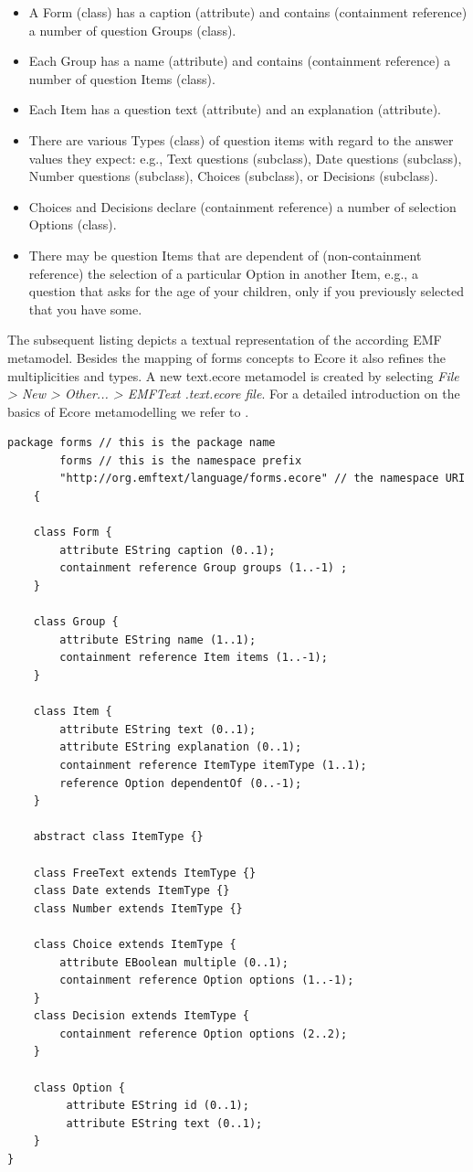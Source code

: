 		\begin{itemize} 
		  \item A Form (class) has a caption (attribute) and contains (containment
		  reference) a number of question Groups (class).
		  \item Each Group has a name (attribute) and contains (containment reference)
		  a number of question Items (class).
		  \item Each Item has a question text (attribute) and an explanation
		  (attribute).
		  \item There are various Types (class) of question items  with
		  regard to the answer values they expect: e.g., Text questions
		  (subclass), Date questions  (subclass), Number questions  (subclass),
		  Choices (subclass), or Decisions (subclass).
		  \item Choices and Decisions declare (containment reference) a number of
		  selection Options (class).
		  \item There may be question Items
		  that are dependent of (non-containment reference) the selection of a 
		  particular Option in another Item, 
		  e.g., a question that asks for the age of your children, only if you
		  previously selected that you have some.
		\end{itemize}

	The subsequent listing depicts a textual representation of the according EMF
	metamodel. Besides the mapping of forms concepts to Ecore it also refines 
	the multiplicities and types. A new text.ecore metamodel is
	created by selecting \emph{File > New > Other... > EMFText .text.ecore
	file}. For a detailed introduction on the basics of Ecore metamodelling we
	refer to \cite{EMF}.

	
	\lstset{language=textecore}
	\begin{lstlisting}
package forms // this is the package name 
        forms // this is the namespace prefix
        "http://org.emftext/language/forms.ecore" // the namespace URI 
	{

	class Form {
		attribute EString caption (0..1);
		containment reference Group groups (1..-1) ;
	}
	
	class Group {
		attribute EString name (1..1);
		containment reference Item items (1..-1);
	}

	class Item {
		attribute EString text (0..1);
		attribute EString explanation (0..1);
		containment reference ItemType itemType (1..1);
		reference Option dependentOf (0..-1);
	}

	abstract class ItemType {}

	class FreeText extends ItemType {}
	class Date extends ItemType {}	
	class Number extends ItemType {}

	class Choice extends ItemType {
		attribute EBoolean multiple (0..1);
		containment reference Option options (1..-1);
	}
	class Decision extends ItemType {
		containment reference Option options (2..2);
	}
		
	class Option {
		 attribute EString id (0..1);
		 attribute EString text (0..1);
	}
}

	\end{lstlisting}
	
